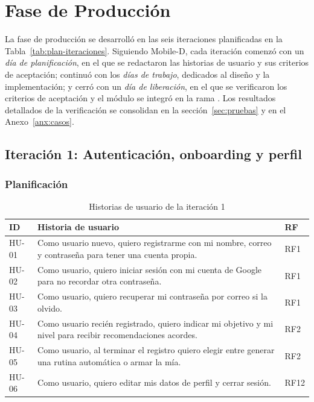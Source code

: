 \section{Fase de Producción}
\label{sec:produccion}

La fase de producción se desarrolló en las seis iteraciones planificadas en la
Tabla~\ref{tab:plan-iteraciones}. Siguiendo Mobile-D, cada iteración comenzó
con un \emph{día de planificación}, en el que se redactaron las historias de
usuario y sus criterios de aceptación; continuó con los \emph{días de
trabajo}, dedicados al diseño y la implementación; y cerró con un \emph{día de
liberación}, en el que se verificaron los criterios de aceptación y el
módulo se integró en la rama . Los resultados detallados de
la verificación se consolidan en la sección~\ref{sec:pruebas} y en el
Anexo~\ref{anx:casos}.

\subsection{Iteración 1: Autenticación, onboarding y perfil}
\label{subsec:it1}

\subsubsection{Planificación}

\begin{table}[H]
\centering
\caption{Historias de usuario de la iteración 1}
\label{tab:hu-it1}
\begin{tabularx}{\textwidth}{|L{1.2cm}|Y|L{1.5cm}|}
\hline
{} \textbf{ID} & \textbf{Historia de usuario} & \textbf{RF} \\
\hline
HU-01 & Como usuario nuevo, quiero registrarme con mi nombre, correo y
contraseña para tener una cuenta propia. & RF1 \\ \hline
HU-02 & Como usuario, quiero iniciar sesión con mi cuenta de Google para no
recordar otra contraseña. & RF1 \\ \hline
HU-03 & Como usuario, quiero recuperar mi contraseña por correo si la
olvido. & RF1 \\ \hline
HU-04 & Como usuario recién registrado, quiero indicar mi objetivo y mi nivel
para recibir recomendaciones acordes. & RF2 \\ \hline
HU-05 & Como usuario, al terminar el registro quiero elegir entre generar una
rutina automática o armar la mía. & RF2 \\ \hline
HU-06 & Como usuario, quiero editar mis datos de perfil y cerrar sesión. &
RF12 \\
\hline
\end{tabularx}
\end{table}

